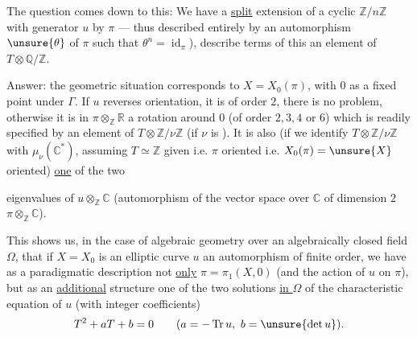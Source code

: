 The question comes down to this: We have a \uline{split} extension
of a cyclic 
\(\mathbb Z/n\mathbb Z\) with generator \(u\) by \(\pi\)
--- thus described entirely by an automorphism
 \(\unsure{\theta}\) of \(\pi\) such that
\(\theta^n=\operatorname{id}_\pi\)), describe  terms of
this an element of \(T\otimes\mathbb Q/\mathbb Z\).

Answer: the  geometric situation
corresponds to \(X=X_0(\pi)\), with \(0\) as a fixed point under \(\Gamma\).
If \(u\) reverses orientation, it is of order  \(2\),
there is no problem, otherwise it is  in
\(\pi\otimes_{\mathbb Z}\mathbb R\) a rotation around \(0\)
(of order \(2,3,4\) or \(6\)) which is readily specified by an element
of  \(T\otimes\mathbb Z/\nu\mathbb Z\)
(if \(\nu\) is ).
It is also (if we identify
\(T\otimes\mathbb Z/\nu\mathbb Z\) with
\(\mu_\nu(\mathbb C^*)\), assuming
\(T\simeq\mathbb Z\) given
i.e. \(\pi\) oriented i.e. \(X_0(\pi)=\unsure{X}\)
oriented) \uline{one} of the two



eigenvalues of \(u\otimes_{\mathbb Z}\mathbb C\)
(automorphism of the vector space over \(\mathbb C\) of dimension \(2\)
\(\pi\otimes_{\mathbb Z}\mathbb C\)).

This shows us, in the case of algebraic geometry over an algebraically closed field
\(\Omega\), that if \(X=X_0\) is an elliptic curve
\(u\) an automorphism of finite order, we have as a paradigmatic
description not \uline{only}
\(\pi=\pi_1(X,0)\)
(and the action of \(u\) on \(\pi\)), but as an
\uline{additional} structure one of the two solutions \uline{in \(\Omega\)}
of the characteristic equation of \(u\) (with integer coefficients)
\[
T^2+aT+b=0
\qquad (a=-\operatorname{Tr}u,\ b=\unsure{\det u}).
\]

